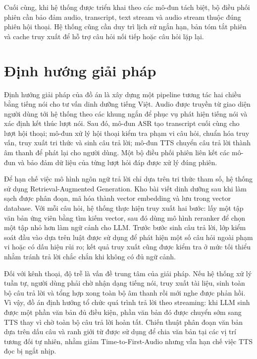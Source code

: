 \documentclass[a4paper,13pt,twoside]{report}
\begin{document}
Cuối cùng, khi hệ thống được triển khai theo các mô-đun tách biệt, bộ điều phối phiên cần bảo đảm audio, transcript, text stream và audio stream thuộc đúng phiên hội thoại. Hệ thống cũng cần duy trì lịch sử ngắn hạn, bản tóm tắt phiên và cache truy xuất để hỗ trợ câu hỏi nối tiếp hoặc câu hỏi lặp lại.

\section{Định hướng giải pháp}

Định hướng giải pháp của đồ án là xây dựng một pipeline tương tác hai chiều bằng tiếng nói cho tư vấn dinh dưỡng tiếng Việt. Audio được truyền từ giao diện người dùng tới hệ thống theo các khung ngắn để phục vụ phát hiện tiếng nói và xác định kết thúc lượt nói. Sau đó, mô-đun ASR tạo transcript cuối cùng cho lượt hội thoại; mô-đun xử lý hội thoại kiểm tra phạm vi câu hỏi, chuẩn hóa truy vấn, truy xuất tri thức và sinh câu trả lời; mô-đun TTS chuyển câu trả lời thành âm thanh để phát lại cho người dùng. Một bộ điều phối phiên liên kết các mô-đun và bảo đảm dữ liệu của từng lượt hỏi đáp được xử lý đúng phiên.

Để hạn chế việc mô hình ngôn ngữ trả lời chỉ dựa trên tri thức tham số, hệ thống sử dụng Retrieval-Augmented Generation. Kho bài viết dinh dưỡng sau khi làm sạch được phân đoạn, mã hóa thành vector embedding và lưu trong vector database. Với mỗi câu hỏi, hệ thống thực hiện truy xuất hai bước: lấy một tập văn bản ứng viên bằng tìm kiếm vector, sau đó dùng mô hình reranker để chọn một tập nhỏ hơn làm ngữ cảnh cho LLM. Trước bước sinh câu trả lời, lớp kiểm soát đầu vào dựa trên luật được sử dụng để phát hiện một số câu hỏi ngoài phạm vi hoặc có dấu hiệu rủi ro; kết quả truy xuất cũng được kiểm tra ở mức tối thiểu nhằm tránh trả lời chắc chắn khi không có đủ ngữ cảnh.

Đối với kênh thoại, độ trễ là vấn đề trung tâm của giải pháp. Nếu hệ thống xử lý tuần tự, người dùng phải chờ nhận dạng tiếng nói, truy xuất tài liệu, sinh toàn bộ câu trả lời và tổng hợp xong toàn bộ âm thanh rồi mới nghe được phản hồi. Vì vậy, đồ án định hướng tổ chức quá trình trả lời theo streaming: khi LLM sinh được một phần văn bản đủ điều kiện, phần văn bản đó được chuyển sớm sang TTS thay vì chờ toàn bộ câu trả lời hoàn tất. Chiến thuật phân đoạn văn bản dựa trên dấu câu và ranh giới từ được sử dụng để chia văn bản tại các vị trí tương đối tự nhiên, nhằm giảm Time-to-First-Audio nhưng vẫn hạn chế việc TTS đọc bị ngắt nhịp.
\end{document}
